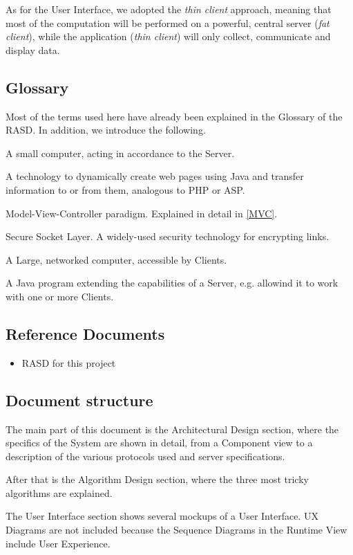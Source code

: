 \documentclass[12pt]{article}
\begin{document}
As for the User Interface, we adopted the \emph{thin client} approach, meaning that most of the computation will be performed on a powerful, central server (\emph{fat client}), while the application (\emph{thin client}) will only collect, communicate and display data.
\subsection{Glossary}
Most of the terms used here have already been explained in the Glossary of the RASD. In addition, we introduce the following.
\begin{description}[leftmargin=!,labelwidth=\widthof{\bfseries Servlet}]
	\item[Client] A small computer, acting in accordance to the Server.
	\item[JSP] A technology to dynamically create web pages using Java and transfer information to or from them, analogous to PHP or ASP.
	\item[MVC] Model-View-Controller paradigm. Explained in detail in \ref{MVC}.
	\item[SSL] Secure Socket Layer. A widely-used security technology for encrypting links.
	\item[Server] A Large, networked computer, accessible by Clients.
	\item[Servlet] A Java program extending the capabilities of a Server, e.g. allowind it to work with one or more Clients.
\end{description}
\subsection{Reference Documents}
\begin{itemize}
	\item RASD for this project
\end{itemize}
\subsection{Document structure}
The main part of this document is the Architectural Design section, where the specifics of the System are shown in detail, from a Component view to a description of the various protocols used and server specifications.

After that is the Algorithm Design section, where the three most tricky algorithms are explained.

The User Interface section shows several mockups of a User Interface. UX Diagrams are not included because the Sequence Diagrams in the Runtime View include User Experience.
\end{document}
